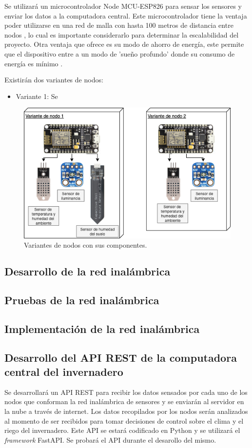 Se utilizará un microcontrolador Node MCU-ESP826 para sensar los sensores y enviar los datos a la computadora central. Este microcontrolador tiene la ventaja poder utilizarse en una red de malla con hasta 100 metros de distancia entre nodos \cite{nodemcu_mesh}, lo cual es importante considerarlo para determinar la escalabilidad del proyecto. Otra ventaja que ofrece es su modo de ahorro de energía, este permite que el dispositivo entre a un modo de 'sueño profundo' donde su consumo de energía es mínimo \cite{nodemcu_datasheet}. 

Existirán dos variantes de nodos:

\begin{itemize}
    \item Variante 1: Se 
\end{itemize}

\begin{figure}[!ht]
	\centering
	\includegraphics[width=.80\linewidth]{imagenes/diagramas/componentes_nodos_wsn.png}
	\caption{Variantes de nodos con sus componentes.}
	\label{fig:coms_nodos_raspberry}
\end{figure}

\subsection{Desarrollo de la red inalámbrica}


\subsection{Pruebas de la red inalámbrica}
\subsection{Implementación de la red inalámbrica}


\subsection{Desarrollo del API REST de la computadora central del invernadero}
Se desarrollará un API REST para recibir los datos sensados por cada uno de los nodos que conforman la red inalámbrica de sensores y se enviarán al servidor en la nube a través de internet. Los datos recopilados por los nodos serán analizados al momento de ser recibidos para tomar decisiones de control sobre el clima y el riego del invernadero. Este API se estará codificado en Python y se utilizará el \textit{framework} FastAPI. Se probará el API durante el desarollo del mismo.

